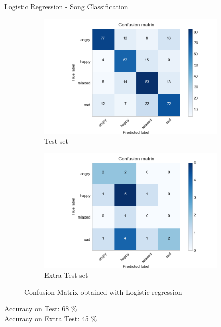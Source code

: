 \documentclass[xcolor=dvipsnames]{beamer}
\begin{document}
\begin{frame}{Logistic Regression  - Song Classification} 

\begin{figure}[h!]
  \centering
  \begin{subfigure}[b]{0.45\linewidth}
    \includegraphics[width=\linewidth]{./images/CM_LR438.png}
    \caption{Test set}
  \end{subfigure}
  \begin{subfigure}[b]{0.45\linewidth}
    \includegraphics[width=\linewidth]{./images/CM_LR20.png}
    \caption{Extra Test set}
  \end{subfigure}
  \caption{Confusion Matrix obtained with Logistic regression}
\end{figure}
Accuracy on Test: 68 \% \\
Accuracy on Extra Test: 45 \%
\end{frame}
\end{document}
